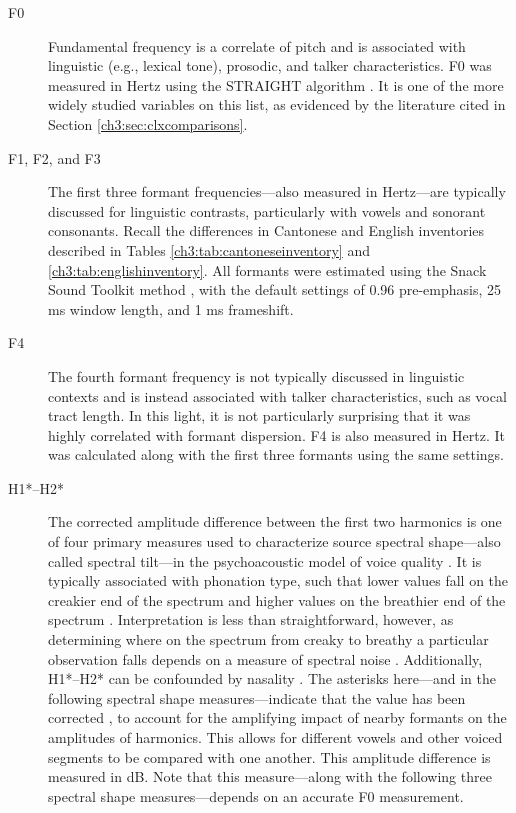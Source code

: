 \begin{description}
    \item[F0] Fundamental frequency is a correlate of pitch and is associated with linguistic (e.g., lexical tone), prosodic, and talker characteristics. F0 was measured in Hertz using the STRAIGHT algorithm \citep{kawahara_2016_straight}. It is one of the more widely studied variables on this list, as evidenced by the literature cited in Section \ref{ch3:sec:clxcomparisons}.
    \item[F1, F2, and F3] The first three formant frequencies---also measured in Hertz---are typically discussed for linguistic contrasts, particularly with vowels and sonorant consonants. Recall the differences in Cantonese and English inventories described in Tables \ref{ch3:tab:cantoneseinventory} and \ref{ch3:tab:englishinventory}. All formants were estimated using the Snack Sound Toolkit method \cite{sjolander_2004_snack}, with the default settings of 0.96 pre-emphasis, 25 ms window length, and 1 ms frameshift.
    \item[F4] The fourth formant frequency is not typically discussed in linguistic contexts and is instead associated with talker characteristics, such as vocal tract length. In this light, it is not particularly surprising that it was highly correlated with formant dispersion. F4 is also measured in Hertz. It was calculated along with the first three formants using the same settings.
    \item[H1*--H2*] The corrected amplitude difference between the first two harmonics is one of four primary measures used to characterize source spectral shape---also called spectral tilt---in the psychoacoustic model of voice quality \citep{kreiman_2014_theory}. It is typically associated with phonation type, such that lower values fall on the creakier end of the spectrum and higher values on the breathier end of the spectrum \citep{garellek_2019_voice}. Interpretation is less than straightforward, however, as determining where on the spectrum from creaky to breathy a particular observation falls depends on a measure of spectral noise \citep[e.g., CPP below;][]{garellek_2019_voice}. Additionally, H1*--H2* can be confounded by nasality \citep{munson_2019_phonetics}. The asterisks here---and in the following spectral shape measures---indicate that the value has been corrected \citep{iseli_2007_voice}, to account for the amplifying impact of nearby formants on the amplitudes of harmonics. This allows for different vowels and other voiced segments to be compared with one another. This amplitude difference is measured in dB. Note that this measure---along with the following three spectral shape measures---depends on an accurate F0 measurement.

\end{description}
